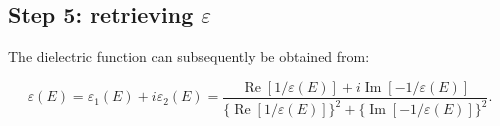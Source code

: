\subsection{Step 5: retrieving $\varepsilon$}
The dielectric function  can subsequently be obtained from:

\begin{equation}
    \varepsilon(E)=\varepsilon_{1}(E)+i \varepsilon_{2}(E)=\frac{\operatorname{Re}[1 / \varepsilon(E)]+i \operatorname{Im}[-1 / \varepsilon(E)]}{\{\operatorname{Re}[1 / \varepsilon(E)]\}^{2}+\{\operatorname{Im}[-1 / \varepsilon(E)]\}^{2}}.
\end{equation}

